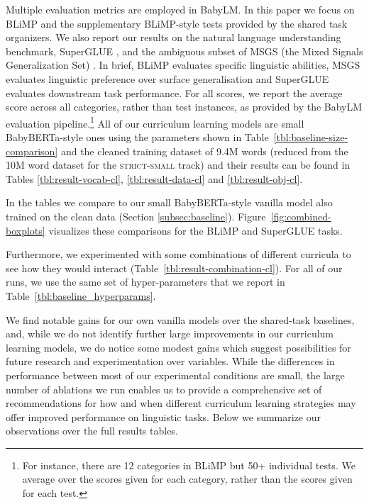 Multiple evaluation metrics are employed in BabyLM. In this paper we focus on BLiMP \cite{warstadt2020blimp} and the supplementary BLiMP-style tests provided by the shared task organizers. We also report our results on the natural language understanding benchmark, SuperGLUE \cite{wang2019superglue}, and the ambiguous subset of MSGS (the Mixed Signals Generalization Set) \cite{warstadt2020msgs}. In brief, BLiMP evaluates specific linguistic abilities, MSGS evaluates linguistic preference over surface generalisation and SuperGLUE evaluates downstream task performance. For all scores, we report the average score across all categories, rather than test instances, as provided by the BabyLM evaluation pipeline.\footnote{For instance, there are 12 categories in BLiMP but 50+ individual tests. We average over the scores given for each category, rather than the scores given for each test.} All of our curriculum learning models are small BabyBERTa-style ones using the parameters shown in Table~\ref{tbl:baseline-size-comparison} and the cleaned training dataset of 9.4M words (reduced from the 10M word dataset for the \textsc{strict-small} track) and their results can be found in Tables \ref{tbl:result-vocab-cl}, \ref{tbl:result-data-cl} and \ref{tbl:result-obj-cl}. 


In the tables we compare to our small BabyBERTa-style vanilla model also trained on the clean data (Section \ref{subsec:baseline}). Figure~\ref{fig:combined-boxplots} visualizes these comparisons for the BLiMP and SuperGLUE tasks.

Furthermore, we experimented with some combinations of different curricula to see how they would interact (Table~\ref{tbl:result-combination-cl}). For all of our runs, we use the same set of hyper-parameters that we report in Table~\ref{tbl:baseline_hyperparams}. 


We find notable gains for our own vanilla models over the shared-task baselines, and, while we do not identify further large improvements in our curriculum learning models, we do notice some modest gains which suggest possibilities for future research and experimentation over variables. While the differences in performance between most of our experimental conditions are small, the large number of ablations we run enables us to provide a comprehensive set of recommendations for how and when different curriculum learning strategies may offer improved performance on linguistic tasks. Below we summarize our observations over the full results tables.

